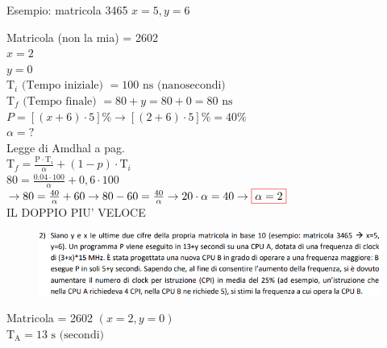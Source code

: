 \textsf{{\small Esempio: matricola 3465 \textrightarrow $x = 5, y = 6$}} \break

\textsf{{\small Matricola (non la mia) = 2602}} \\
$ x = 2 $ \\
$ y = 0 $ \\

$ \text{T}_i \text{ (Tempo iniziale) } = 100 \text{ ns (nanosecondi)} $ \\

$ \text{T}_f \text{ (Tempo finale) } = 80 + y = 80 + 0 = 80 \text{ ns}$ \\

$ P = [(x + 6)\cdot 5]\% \rightarrow [(2 + 6)\cdot 5]\% = 40\% $ \\

$ \alpha = ? $ \\

\textsf{{\large Legge di Amdhal a pag.\pageref{fig:leggediamdhal}}} \\

$ \text{T}_f = \frac{\text{P}\cdot \text{T}_i}{\alpha} + (1 - p) \cdot \text{T}_i $ \\

$ 80 = \frac{0.04 \cdot 100}{\alpha} + 0,6 \cdot 100 $ \\

$ \rightarrow 80 = \frac{40}{\alpha} + 60 \rightarrow 80 - 60 = \frac{40}{\alpha} \rightarrow 20 \cdot \alpha = 40 \rightarrow \color{red}\boxed{\normalcolor\alpha = 2} $ \\

\textrm{\color{red}IL DOPPIO PIU' VELOCE} \\


\begin{figure}[ht]
	\includegraphics[width=1\linewidth]{es2_MiglioramentoPrestazioneMemoria}
	\label{fig:es2MiglioramentoPrestazioneMemoria}
\end{figure}
\enlargethispage{60pt}
\textsf{{\small Matricola = 2602}} $ (x = 2,y = 0) $\\

$ \text{T}_\text{A} = 13 \text{ s (secondi)} $ \\

